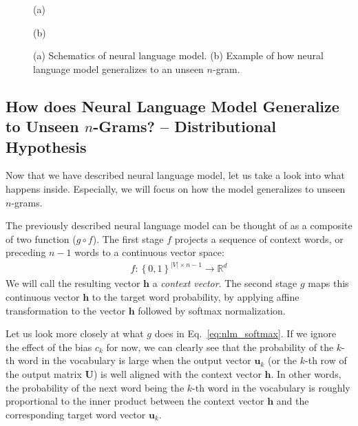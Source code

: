 \documentclass{report}
\newcommand{\vect}[1]{\mathbf{#1}}
\newcommand{\matr}[1]{\mathbf{#1}}
\newcommand{\vh}[0]{\vect{h}}
\newcommand{\vu}[0]{\vect{u}}
\newcommand{\mU}[0]{\matr{U}}
\newcommand{\RR}[0]{\mathbb{R}}
\begin{document}
\begin{figure}[t]
\begin{minipage}[!b]{0.49\textwidth}
    \end{minipage}
    \begin{minipage}[!b]{0.49\textwidth}
        \centering
        (a)
    \end{minipage}
    \begin{minipage}[!b]{0.49\textwidth}
        \centering
        (b)
    \end{minipage}
    \caption{(a) Schematics of neural language model. (b) Example of how neural language model generalizes to an unseen
    $n$-gram.}
    \label{fig:nlm}
\end{figure}

\subsection{How does Neural Language Model Generalize to Unseen $n$-Grams? --
Distributional Hypothesis}
\label{sec:distributional}

Now that we have described neural language model, let us take a look into what
happens inside. Especially, we will focus on how the model generalizes to unseen
$n$-grams.

The previously described neural language model can be thought of as a composite
of two function ($g \circ f$). The first stage $f$ projects a sequence of
context words, or preceding $n-1$ words to a continuous vector space:
\begin{align*}
    f: \left\{ 0, 1\right\}^{|V| \times n-1} \to \RR^d
\end{align*}
We will call the resulting vector $\vh$ a {\em context vector}.
The second stage $g$ maps this continuous vector $\vh$ to the target word
probability, by applying affine transformation to the vector $\vh$ followed by
softmax normalization. 

Let us look more closely at what $g$ does in Eq.~\eqref{eq:nlm_softmax}. If we
ignore the effect of the bias $c_k$ for now, we can clearly see that the
probability of the $k$-th word in the vocabulary is large when the output vector
$\vu_k$ (or the $k$-th row of the output matrix $\mU$) is well aligned with the
context vector $\vh$. In other words, the probability of the next word being the
$k$-th word in the vocabulary is roughly proportional to the inner product
between the context vector $\vh$ and the corresponding target word vector
$\vu_k$.
\end{document}
